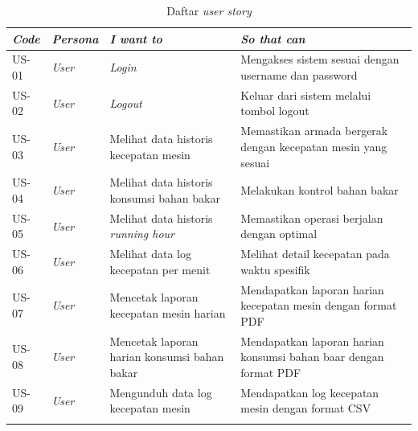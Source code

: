    \begin{longtable}[!h]
        {
            p{}
            p{}
            p{}
            p{}
        }
        \caption{Daftar \textit{user story}} \\

            \toprule
            \textit{Code} &
            \textit{Persona} &
            \textit{I want to} &
            \textit{So that can} \\ [0.5ex]
            \midrule

            US-01 &
            \textit{User} &
            \textit{Login} &
            Mengakses sistem sesuai dengan username dan password
            \\

            US-02 &
            \textit{User} &
            \textit{Logout} &
            Keluar dari sistem melalui tombol logout \\

            US-03 &
            \textit{User} &
            Melihat data historis kecepatan mesin &
            Memastikan armada bergerak dengan kecepatan mesin yang sesuai
            \\

            US-04 &
            \textit{User} &
            Melihat data historis konsumsi bahan bakar &
            Melakukan kontrol bahan bakar
            \\

            US-05 &
            \textit{User} &
            Melihat data historis \textit{running hour} &
            Memastikan operasi berjalan dengan optimal
            \\

            US-06 &
            \textit{User} &
            Melihat data log kecepatan per menit &
            Melihat detail kecepatan pada waktu spesifik
            \\

            US-07 &
            \textit{User} &
            Mencetak laporan kecepatan mesin harian &
            Mendapatkan laporan harian kecepatan mesin dengan format PDF
            \\

            US-08 &
            \textit{User} &
            Mencetak laporan harian konsumsi bahan bakar &
            Mendapatkan laporan harian konsumsi bahan baar dengan format PDF
            \\

            US-09 &
            \textit{User} &
            Mengunduh data log kecepatan mesin &
            Mendapatkan log kecepatan mesin dengan format CSV
            \\ [1ex]
            \bottomrule
        \label{tab:user-story}
    \end{longtable}

